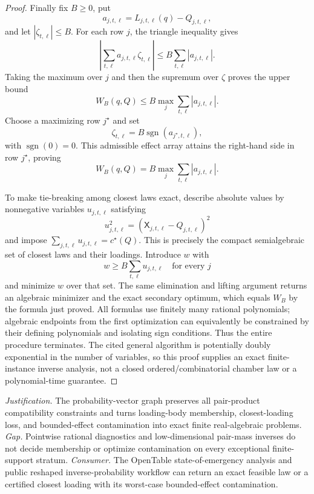 \documentclass{article}
\begin{document}
\begin{proof}
Finally fix \(B\geq0\), put
\[
 a_{j,t,\ell}=L_{j,t,\ell}(q)-Q_{j,t,\ell},
\]
and let \(|\zeta_{t,\ell}|\leq B\).  For each row \(j\), the triangle inequality gives
\[
 \left|\sum_{t,\ell}a_{j,t,\ell}\zeta_{t,\ell}\right|
 \leq B\sum_{t,\ell}|a_{j,t,\ell}|.
\]
Taking the maximum over \(j\) and then the supremum over \(\zeta\) proves the upper bound
\[
 W_B(q,Q)\leq
 B\max_j\sum_{t,\ell}|a_{j,t,\ell}|.
\]
Choose a maximizing row \(j^{\star}\) and set
\[
 \zeta_{t,\ell}=B\operatorname{sgn}(a_{j^{\star},t,\ell}),
\]
with \(\operatorname{sgn}(0)=0\).  This admissible effect array attains the right-hand side in row \(j^{\star}\), proving
\[
 W_B(q,Q)=B\max_j\sum_{t,\ell}|a_{j,t,\ell}|.
\]

To make tie-breaking among closest laws exact, describe absolute values by nonnegative variables \(u_{j,t,\ell}\) satisfying
\[
 u_{j,t,\ell}^2=(\mathsf X_{j,t,\ell}-Q_{j,t,\ell})^2
\]
and impose \(\sum_{j,t,\ell}u_{j,t,\ell}=c^{\star}(Q)\).  This is precisely the compact semialgebraic set of closest laws and their loadings.  Introduce \(w\) with
\[
 w\geq B\sum_{t,\ell}u_{j,t,\ell}
 \quad\text{for every }j
\]
and minimize \(w\) over that set.  The same elimination and lifting argument returns an algebraic minimizer and the exact secondary optimum, which equals \(W_B\) by the formula just proved.  All formulas use finitely many rational polynomials; algebraic endpoints from the first optimization can equivalently be constrained by their defining polynomials and isolating sign conditions.  Thus the entire procedure terminates.  The cited general algorithm is potentially doubly exponential in the number of variables, so this proof supplies an exact finite-instance inverse analysis, not a closed ordered/combinatorial chamber law or a polynomial-time guarantee.
\end{proof}
\par\smallskip\noindent \textit{Justification.} The probability-vector graph preserves all pair-product compatibility constraints and turns loading-body membership, closest-loading loss, and bounded-effect contamination into exact finite real-algebraic problems. \textit{Gap.} Pointwise rational diagnostics and low-dimensional pair-mass inverses do not decide membership or optimize contamination on every exceptional finite-support stratum. \textit{Consumer.} The OpenTable state-of-emergency analysis and public reshaped inverse-probability workflow can return an exact feasible law or a certified closest loading with its worst-case bounded-effect contamination.
\end{document}

